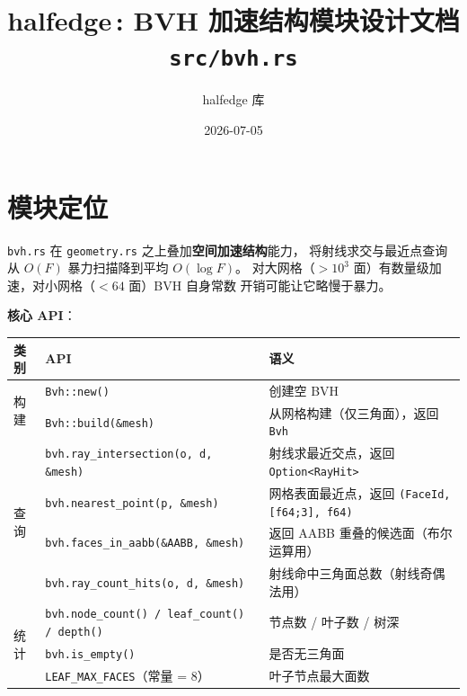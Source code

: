 \documentclass[11pt,a4paper]{article}
\title{\textbf{halfedge\,: BVH 加速结构模块设计文档} \\ \large \texttt{src/bvh.rs}}
\author{halfedge 库}
\date{2026-07-05}
\begin{document}
\maketitle
\tableofcontents

\section{模块定位}

\texttt{bvh.rs} 在 \texttt{geometry.rs} 之上叠加\textbf{空间加速结构}能力，
将射线求交与最近点查询从 $O(F)$ 暴力扫描降到平均 $O(\log F)$。
对大网格（$> 10^3$ 面）有数量级加速，对小网格（$< 64$ 面）BVH 自身常数
开销可能让它略慢于暴力。

\textbf{核心 API}：

\begin{center}
\renewcommand{\arraystretch}{1.18}
\begin{tabular}{@{}lll@{}}
  \toprule
  \textbf{类别} & \textbf{API} & \textbf{语义} \\
  \midrule
  \multirow{2}{*}{构建}
    & \texttt{Bvh::new()}                  & 创建空 BVH \\
    & \texttt{Bvh::build(\&mesh)}          & 从网格构建（仅三角面），返回 \texttt{Bvh} \\
  \midrule
  \multirow{4}{*}{查询}
    & \texttt{bvh.ray\_intersection(o, d, \&mesh)} & 射线求最近交点，返回 \texttt{Option<RayHit>} \\
    & \texttt{bvh.nearest\_point(p, \&mesh)}      & 网格表面最近点，返回 \texttt{(FaceId, [f64;3], f64)} \\
    & \texttt{bvh.faces\_in\_aabb(\&AABB, \&mesh)} & 返回 AABB 重叠的候选面（布尔运算用） \\
    & \texttt{bvh.ray\_count\_hits(o, d, \&mesh)}  & 射线命中三角面总数（射线奇偶法用） \\
  \midrule
  \multirow{3}{*}{统计}
    & \texttt{bvh.node\_count() / leaf\_count() / depth()} & 节点数 / 叶子数 / 树深 \\
    & \texttt{bvh.is\_empty()}                                & 是否无三角面 \\
    & \texttt{LEAF\_MAX\_FACES}（常量 = 8）                   & 叶子节点最大面数 \\
  \bottomrule
\end{tabular}
\end{center}
\end{document}
